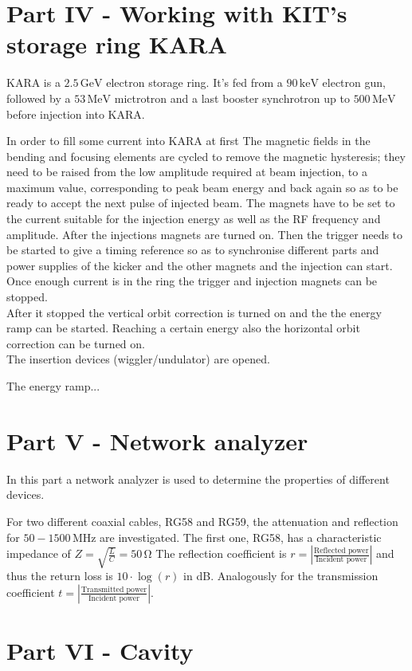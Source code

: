 \section{Part IV - Working with KIT's storage ring KARA}
KARA is a $2.5\,\mathrm{GeV}$ electron storage ring. It's fed from a $90\,\mathrm{keV}$ electron gun, followed by a $53\,\mathrm{MeV}$ mictrotron and a last booster synchrotron up to $500\,\mathrm{MeV}$ before injection into KARA.
\par
In order to fill some current into KARA at first 
The magnetic fields in the bending and focusing elements are cycled to remove the magnetic hysteresis; they need to be raised from the low amplitude required at beam injection, to a maximum value, corresponding to peak beam energy and back again so as to be ready to accept the next pulse of injected beam.
The magnets have to be set to the current suitable for the injection energy as well as the RF frequency and amplitude.
After the injections magnets are turned on.
Then the trigger needs to be started to give a timing reference so as to synchronise different parts and power supplies of the kicker and the other magnets and the injection can start. 
Once enough current is in the ring the trigger and injection magnets can be stopped.\\
After it stopped the vertical orbit correction is turned on and the the energy ramp can be started. 
Reaching a certain energy also the horizontal orbit correction can be turned on.\\
The insertion devices (wiggler/undulator) are opened.
\par
The energy ramp...
\par

\section{Part V - Network analyzer}
In this part a network analyzer is used to determine the properties of different devices.
\par
For two different coaxial cables, RG58 and RG59, the attenuation and reflection  for $50-1500\,\mathrm{MHz}$ are investigated.
The first one, RG58, has a characteristic impedance of $Z=\sqrt{\frac{L}{C}}=50\,\mathrm{\Omega}$
The reflection coefficient is $r=\left|\frac{\text{Reflected power}}{\text{Incident power}}\right|$ and thus the return loss is $10\cdot\log(r)$ in dB. Analogously for the transmission coefficient $t=\left|\frac{\text{Transmitted power}}{\text{Incident power}}\right|$.
\section{Part VI - Cavity}